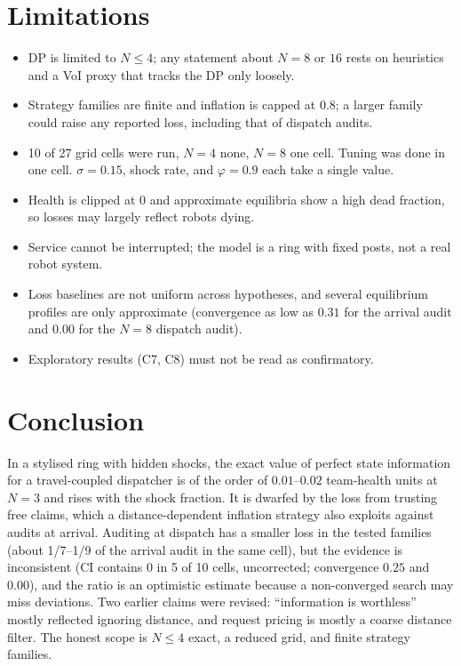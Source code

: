 \documentclass[10pt]{article}
\begin{document}
\section{Limitations}\label{sec:limits}
\begin{itemize}
\item DP is limited to $N\le4$; any statement about $N{=}8$ or $16$ rests on heuristics and a VoI proxy that tracks the DP only loosely.
\item Strategy families are finite and inflation is capped at $0.8$; a larger family could raise any reported loss, including that of dispatch audits.
\item 10 of 27 grid cells were run, $N{=}4$ none, $N{=}8$ one cell. Tuning was done in one cell. $\sigma{=}0.15$, shock rate, and $\varphi{=}0.9$ each take a single value.
\item Health is clipped at $0$ and approximate equilibria show a high dead fraction, so losses may largely reflect robots dying.
\item Service cannot be interrupted; the model is a ring with fixed posts, not a real robot system.
\item Loss baselines are not uniform across hypotheses, and several equilibrium profiles are only approximate (convergence as low as $0.31$ for the arrival audit and $0.00$ for the $N{=}8$ dispatch audit).
\item Exploratory results (C7, C8) must not be read as confirmatory.
\end{itemize}

\section{Conclusion}
In a stylised ring with hidden shocks, the exact value of perfect state information for a travel-coupled dispatcher is of the order of $0.01$--$0.02$ team-health units at $N{=}3$ and rises with the shock fraction. It is dwarfed by the loss from trusting free claims, which a distance-dependent inflation strategy also exploits against audits at arrival. Auditing at dispatch has a smaller loss in the tested families (about 1/7--1/9 of the arrival audit in the same cell), but the evidence is inconsistent (CI contains $0$ in 5 of 10 cells, uncorrected; convergence $0.25$ and $0.00$), and the ratio is an optimistic estimate because a non-converged search may miss deviations. Two earlier claims were revised: ``information is worthless'' mostly reflected ignoring distance, and request pricing is mostly a coarse distance filter. The honest scope is $N\le4$ exact, a reduced grid, and finite strategy families.
\end{document}

